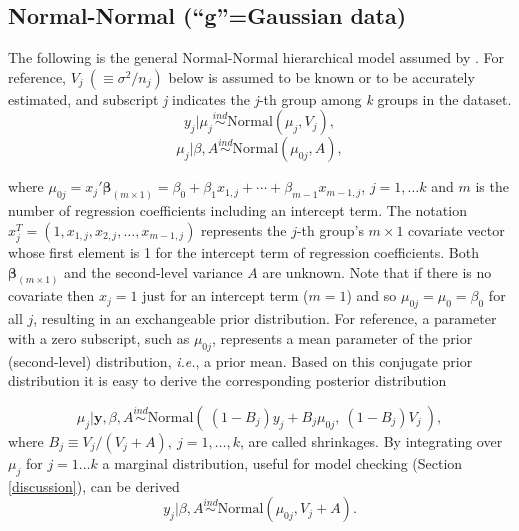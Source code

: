 \documentclass[article]{jss}
\begin{document}
\subsection[Normal-Normal]{Normal-Normal (``g''=Gaussian data)}
The following is the general Normal-Normal hierarchical model assumed by . For reference,  $V_{j}~(\equiv \sigma^{2}/n_{j})$ below is assumed to be known or to be accurately estimated, and subscript \emph{j} indicates the \emph{j}-th group among \emph{k} groups in the dataset.
\begin{equation}\label{normalobs}
y_{j}\vert \mu_{j} \stackrel{ind}{\sim}\textrm{Normal}(\mu_{j}, V_{j}),
\end{equation}
\begin{equation}\label{normalprior}
\mu_{j}\vert \beta, A\stackrel{ind}{\sim}\textrm{Normal}(\mu_{0j}, A),
\end{equation}

where $\mu_{0j} = x_{j}' \mathbf{\beta}_{(m\times1)}=\beta_{0}+\beta_{1}x_{1, j} + \cdots + \beta_{m-1}x_{m-1, j}$, $j=1, \ldots k$ and $m$ is the number of regression coefficients including an intercept term. The notation $x_{j}^{T}=(1, x_{1, j}, x_{2, j}, \ldots, x_{m-1, j})$ represents the $j$-th group's $m\times 1$ covariate vector whose first element is 1 for the intercept term of regression coefficients. Both $\mathbf{\beta}_{(m\times1)}$ and the second-level variance $A$ are unknown. Note that if there is no covariate then $x_{j}=1$ just for an intercept term ($m=1$) and so $\mu_{0j}=\mu_{0}=\beta_{0}$ for all $j$, resulting in an exchangeable prior distribution. For reference, a parameter with a zero subscript, such as $\mu_{0j}$, represents a mean parameter of the prior (second-level) distribution, \emph{i.e.}, a prior mean. Based on this conjugate prior distribution it is easy to derive the corresponding posterior distribution



\begin{equation} \label{normalpost}
\mu_{j}\vert \textbf{y}, \beta, A \stackrel{ind}{\sim}\textrm{Normal}(~(1-B_{j})y_{j} + B_{j}\mu_{0j},~(1-B_{j})V_{j}~),
\end{equation}
where $B_{j}\equiv V_{j}/(V_{j} + A),~j=1, \ldots, k$, are called shrinkages. By integrating over $\mu_{j}$ for $j = 1 \ldots k$ a marginal distribution, useful for model checking (Section \ref{discussion}), can be derived
\begin{equation} \label{normalmarginal}
y_{j}\vert \beta, A \stackrel{ind}{\sim}\textrm{Normal}(\mu_{0j}, V_{j} + A). 
\end{equation}
\end{document}
